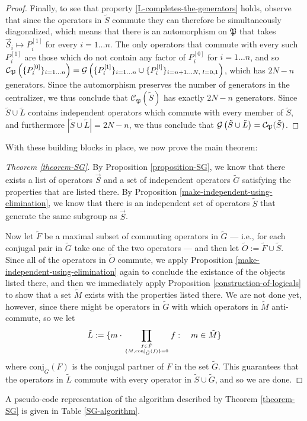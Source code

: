 \documentclass[twocolumn,showpacs,preprintnumbers,amsmath,amssymb,nofootinbib,pra,floatfix]{revtex4-1}
\newenvironment{remark}[1][Remark]{\begin{trivlist}
\item[\hskip \labelsep {\bfseries #1}]}{\end{trivlist}}
\newcommand{\lst}{\vec}
\newcommand{\set}{\tilde}
\newcommand{\genfun}{\mathcal{G}}
\newcommand{\pauligroup}{\mathfrak{P}}
\newcommand{\centralizer}{\mathcal{C}}
\begin{document}
\begin{proof}
Finally, to see that property \ref{L-completes-the-generators} holds, observe that since the operators in $\set S$ commute they can therefore be simultaneously diagonalized, which means that there is an automorphism on $\pauligroup$ that takes $\lst S_i\mapsto P_i^{[1]}$ for every $i=1 \dots n$.  The only operators that commute with every such $P_i^{[1]}$ are those which do not contain any factor of $P_i^{[0]}$ for $i=1 \dots n$, and so $\centralizer_\pauligroup\paren{\{P_i^{[0]}\}_{i=1\dots n}} = \genfun\paren{\{P_i^{[1]}\}_{i=1 \dots n}\cup \{P_i^{[l]}\}_{i=n+1 \dots N, \,\, l=0,1}}$, which has $2N-n$ generators.  Since the automorphism preserves the number of generators in the centralizer, we thus conclude that $\centralizer_\pauligroup(\set S)$ has exactly $2N-n$ generators.  Since $\set S\cup\set L$ contains independent operators which commute with every member of $\set S$, and furthermore $|\set S\cup\set L|=2N-n$, we thus conclude that $\genfun\paren{\set S\cup\set L}=\centralizer_\pauligroup(\set S)$.
\end{proof}
With these building blocks in place, we now prove the main theorem:

\begin{proof}[Theorem \ref{theorem-SG}]
By Proposition \ref{proposition-SG}, we know that there exists a list of operators $\lst S$ and a set of independent operators $\set G$ satisfying the properties that are listed there.  By Proposition \ref{make-independent-using-elimination}, we know that there is an independent set of operators $\set S$ that generate the same subgroup as $\lst S$.  

Now let $\set F$ be a maximal subset of commuting operators in $\set G$ --- i.e., for each conjugal pair in $\set G$ take one of the two operators --- and then let $\set O := \set F \cup \set S$.  Since all of the operators in $\set O$ commute, we apply Proposition \ref{make-independent-using-elimination} again to conclude the existance of the objects listed there, and then we immediately apply Proposition \ref{construction-of-logicals} to show that a set $\set M$ exists with the properties listed there.  We are not done yet, however, since there might be operators in $\set G$ with which operators in $\set M$ anti-commute, so we let
$$\set L := \{m\cdot\prod_{f\in \set F\atop \{M,\text{conj}_{\set G}(f)\}=0} f :\quad m \in\set M\}$$
where $\text{conj}_{\set G}(F)$ is the conjugal partner of $F$ in the set $\set G$.  This guarantees that the operators in $\set L$ commute with every operator in $\set S\cup\set G$, and so we are done.
\end{proof}
\begin{remark}
A pseudo-code representation of the algorithm described by Theorem \ref{theorem-SG} is given in Table \ref{SG-algorithm}.
\end{remark}
\end{document}
